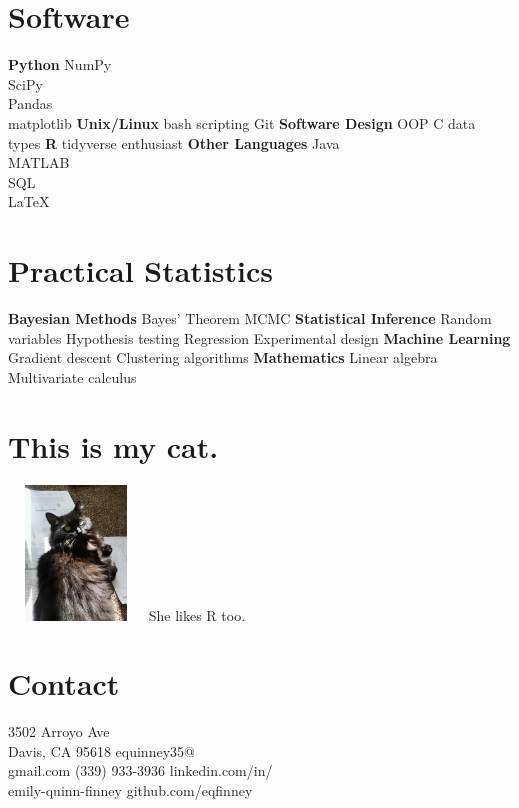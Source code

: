\documentclass[]{cv-style}          %
\begin{document}
\begin{aside}
%
\section{Software}
\textbf{Python}
NumPy\\ SciPy\\ Pandas\\ matplotlib
\textbf{Unix/Linux}
bash scripting
Git
\textbf{Software Design}
OOP
C data types
\textbf{R}
tidyverse enthusiast
\textbf{Other Languages}
Java\\ MATLAB\\ SQL\\ \LaTeX
%
\section{Practical Statistics}
\textbf{Bayesian Methods}
Bayes' Theorem
MCMC
\textbf{Statistical Inference}
Random variables
Hypothesis testing
Regression
Experimental design
\textbf{Machine Learning}
Gradient descent
Clustering algorithms
\textbf{Mathematics}
Linear algebra
Multivariate calculus
%
\section{This is my cat.}
\includegraphics[width=3.6cm,height=3.6cm]{athena.jpg}
She likes R too.
%
\section{Contact}
3502 Arroyo Ave\\ Davis, CA 95618
%
equinney35@\\\hspace{0.5cm}gmail.com
%
(339) 933-3936
%
linkedin.com/in/\\\hspace{0.5cm}emily-quinn-finney
%
github.com/eqfinney
%
\end{aside}
\end{document}
